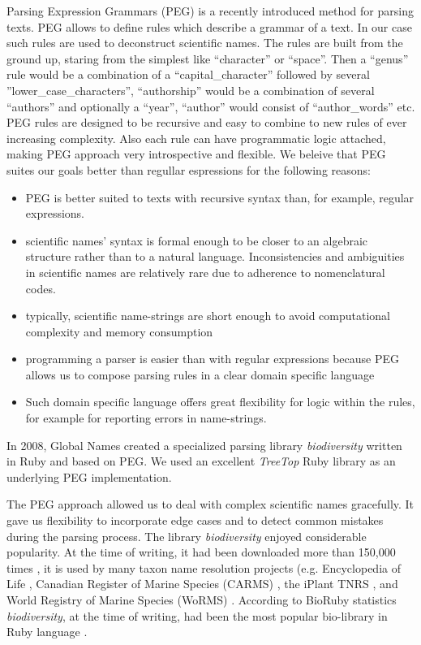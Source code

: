 \documentclass{bmcart}
\begin{document}
Parsing Expression Grammars (PEG) \cite{Ford2004} is a recently introduced
method for parsing texts. PEG allows to define rules which describe a grammar
of a text. In our case such rules are used to deconstruct scientific names.
The rules are built from the ground up, staring from the simplest like
``character'' or ``space''. Then a ``genus'' rule would be a combination of a
``capital\_character'' followed by several ''lower\_case\_characters'',
``authorship'' would be a combination of several ``authors'' and optionally a
``year'', ``author'' would consist of ``author\_words'' etc. PEG rules are
designed to be recursive and easy to combine to new rules of ever increasing
complexity. Also each rule can have programmatic logic attached, making PEG
approach very introspective and flexible. We beleive that PEG suites our
goals better than regullar espressions for the following reasons:

\begin{itemize}

  \item PEG is better suited to texts with recursive syntax than, for example,
    regular expressions.

  \item scientific names' syntax is formal enough to be closer to an algebraic
    structure rather than to a natural language. Inconsistencies and
    ambiguities in scientific names are relatively rare due to adherence to
    nomenclatural codes.

  \item typically, scientific name-strings are short enough to avoid
    computational complexity and memory consumption

  \item programming a parser is easier than with regular expressions because
    PEG allows us to compose parsing rules in a clear domain specific language

  \item Such domain specific language offers great flexibility for logic within
    the rules, for example for reporting errors in name-strings.

\end{itemize}

In 2008, Global Names created a specialized parsing library
\textit{biodiversity} \cite{biodiversity} written in Ruby and based on PEG. We
used an excellent \textit{TreeTop} Ruby library \cite{treetop} as an underlying
PEG implementation.

The PEG approach allowed us to deal with complex scientific names gracefully.
It gave us flexibility to incorporate edge cases and to detect common mistakes
during the parsing process. The library \textit{biodiversity} enjoyed
considerable popularity. At the time of writing, it had been downloaded more
than 150,000 times \cite{bdiv-downloads}, it is used by many taxon name
resolution projects (e.g. Encyclopedia of Life \cite{eol}, Canadian Register of
Marine Species (CARMS) \cite{carms}, the iPlant TNRS \cite{iplant}, and World
Registry of Marine Species (WoRMS) \cite{worms}.  According to BioRuby
statistics \textit{biodiversity}, at the time of writing, had been the most
popular bio-library in Ruby language \cite{biogems}.
\end{document}
